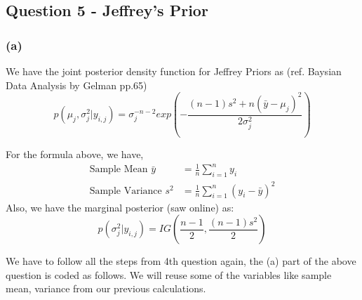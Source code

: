 \documentclass[]{article}
\begin{document}
\subsection{Question 5 - Jeffrey's
Prior}\label{question-5---jeffreys-prior}

\subsubsection{(a)}\label{a-3}

We have the joint posterior density function for Jeffrey Priors as (ref.
Baysian Data Analysis by Gelman pp.65)
\[ p(\mu_j,\sigma_j^2|y_{i,j}) = \sigma_j^{-n-2} exp\left(-\frac{(n-1)s^2+n(\bar{y}-\mu_j)^2}{2\sigma_j^2}\right)\]

For the formula above, we have, \[
\begin{align*}
\text{Sample Mean } \bar{y} &= \frac{1}{n}\sum_{i=1}^{n} y_i \\
\text{Sample Variance } s^2 &= \frac{1}{n}\sum_{i=1}^{n} (y_i - \bar{y})^2
\end{align*}
\] Also, we have the marginal posterior (saw online) as:
\[p(\sigma_j^2|y_{i,j}) = IG\left(\frac{n-1}{2},\frac{(n-1)s^2}{2}\right)\]

We have to follow all the steps from 4th question again, the (a) part of
the above question is coded as follows. We will reuse some of the
variables like sample mean, variance from our previous calculations.
\end{document}
